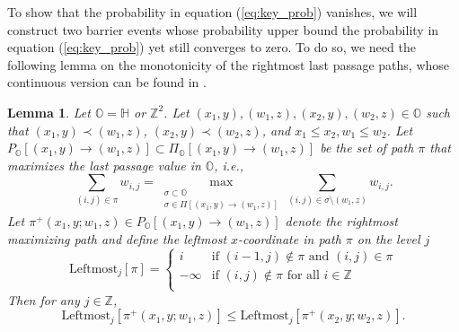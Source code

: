 \documentclass[11pt]{article}
\newtheorem{lemma}[theorem]{Lemma}
\theoremstyle{definition}
\newcommand{\Z}{\mathbb{Z}}
\newcommand{\OO}{\mathbb{O}}
\newcommand{\HH}{\mathbb{H}}
\begin{document}
To show that the probability in equation (\ref{eq:key_prob}) vanishes, we will construct two barrier events whose probability upper bound the probability in equation (\ref{eq:key_prob}) yet still converges to zero. To do so, we need the following lemma on the monotonicity of the rightmost last passage paths, whose continuous version can be found in \cite[Lemma 3.6]{dauvergne2022directed}.

\begin{lemma}\label{lemma_monotonicity}
    Let $\OO = \HH$ or $\Z^2$. Let $(x_1,y),(w_1,z),(x_2,y),(w_2,z) \in \OO$ such that $(x_1,y) \prec (w_1,z)$, $(x_2,y) \prec (w_2,z)$, and $x_1 \leq x_2, w_1 \leq w_2$. Let $P_{\OO}[(x_1,y) \rightarrow (w_1,z)] \subset \Pi_{\OO}[(x_1,y) \rightarrow (w_1,z)]$ be the set of path $\pi$ that maximizes the last passage value in $\OO$, i.e.,
    \[
    \sum_{(i,j) \in \pi} w_{i,j} = \max_{\substack{ \sigma \subset \OO \\\sigma \in \Pi[(x_1,y)\to(w_1,z)]}} \sum_{(i,j)\in \sigma \setminus (w_1,z)} w_{i,j}.
    \]
    Let $\pi^+(x_1,y;w_1,z) \in P_{\OO}[(x_1,y) \rightarrow (w_1,z)]$ denote the rightmost maximizing path and define the leftmost $x$-coordinate in path $\pi$ on the level $j$
    \begin{equation}
        \text{Leftmost}_j \left[\pi \right] = \begin{cases}
i & \text{if } (i-1,j) \notin \pi \text{ and } (i,j) \in \pi\\
-\infty & \text{if } (i,j) \notin \pi \text{ for all } i \in \Z \\
\end{cases}
    \end{equation}
    Then for any $j \in \Z$,
    \[\text{Leftmost}_j \left[\pi^+(x_1,y;w_1,z) \right] \leq \text{Leftmost}_j \left[\pi^+(x_2,y;w_2,z) \right].\]
\end{lemma}
\end{document}
